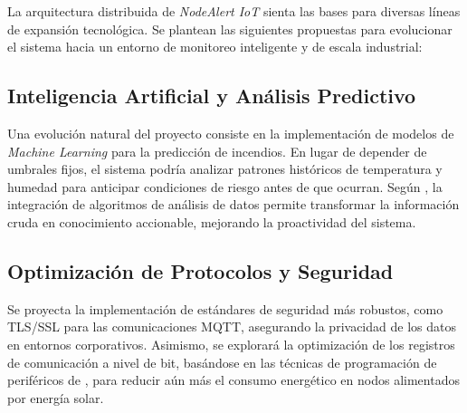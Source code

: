 
La arquitectura distribuida de \textit{NodeAlert IoT} sienta las bases para diversas líneas de expansión tecnológica. Se plantean las siguientes propuestas para evolucionar el sistema hacia un entorno de monitoreo inteligente y de escala industrial:

\subsection{Inteligencia Artificial y Análisis Predictivo}
Una evolución natural del proyecto consiste en la implementación de modelos de \textit{Machine Learning} para la predicción de incendios. En lugar de depender de umbrales fijos, el sistema podría analizar patrones históricos de temperatura y humedad para anticipar condiciones de riesgo antes de que ocurran. Según \citet{deitel2004}, la integración de algoritmos de análisis de datos permite transformar la información cruda en conocimiento accionable, mejorando la proactividad del sistema.

\subsection{Optimización de Protocolos y Seguridad}
Se proyecta la implementación de estándares de seguridad más robustos, como TLS/SSL para las comunicaciones MQTT, asegurando la privacidad de los datos en entornos corporativos. Asimismo, se explorará la optimización de los registros de comunicación a nivel de bit, basándose en las técnicas de programación de periféricos de \citet{mazidi2014}, para reducir aún más el consumo energético en nodos alimentados por energía solar.